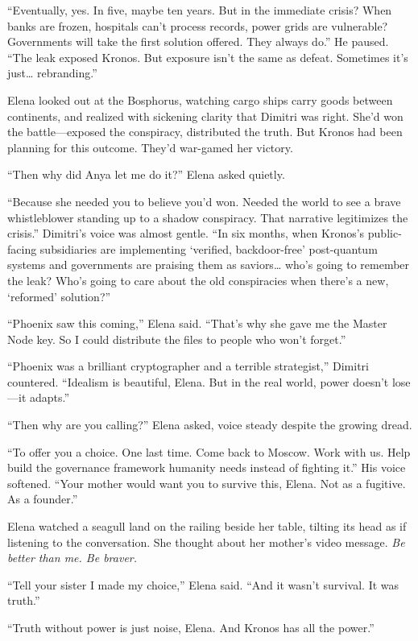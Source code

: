 ``Eventually, yes. In five, maybe ten years. But in the immediate crisis? When banks are frozen, hospitals can't process records, power grids are vulnerable? Governments will take the first solution offered. They always do.'' He paused. ``The leak exposed Kronos. But exposure isn't the same as defeat. Sometimes it's just\ldots{} rebranding.''

Elena looked out at the Bosphorus, watching cargo ships carry goods between continents, and realized with sickening clarity that Dimitri was right. She'd won the battle---exposed the conspiracy, distributed the truth. But Kronos had been planning for this outcome. They'd war-gamed her victory.

``Then why did Anya let me do it?'' Elena asked quietly.

``Because she needed you to believe you'd won. Needed the world to see a brave whistleblower standing up to a shadow conspiracy. That narrative legitimizes the crisis.'' Dimitri's voice was almost gentle. ``In six months, when Kronos's public-facing subsidiaries are implementing `verified, backdoor-free' post-quantum systems and governments are praising them as saviors\ldots{} who's going to remember the leak? Who's going to care about the old conspiracies when there's a new, `reformed' solution?''

``Phoenix saw this coming,'' Elena said. ``That's why she gave me the Master Node key. So I could distribute the files to people who won't forget.''

``Phoenix was a brilliant cryptographer and a terrible strategist,'' Dimitri countered. ``Idealism is beautiful, Elena. But in the real world, power doesn't lose---it adapts.''

``Then why are you calling?'' Elena asked, voice steady despite the growing dread.

``To offer you a choice. One last time. Come back to Moscow. Work with us. Help build the governance framework humanity needs instead of fighting it.'' His voice softened. ``Your mother would want you to survive this, Elena. Not as a fugitive. As a founder.''

Elena watched a seagull land on the railing beside her table, tilting its head as if listening to the conversation. She thought about her mother's video message. \emph{Be better than me. Be braver.}

``Tell your sister I made my choice,'' Elena said. ``And it wasn't survival. It was truth.''

``Truth without power is just noise, Elena. And Kronos has all the power.''

